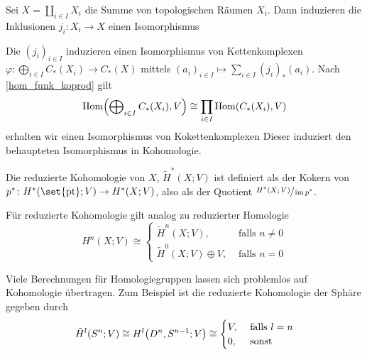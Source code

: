 \begin{satz}[{name=[Kohomologie und Summe von topologischen Räumen]}]
	Sei $X= \coprod_{i \in I} X_i$ die Summe von topologischen Räumen $X_i$. Dann induzieren die Inklusionen $j_i \colon X_i \to X$ einen Isomorphismus 
\end{satz}
\begin{beweis}
	Die $(j_i)_{i \in I}$ induzieren einen Isomorphismus von Kettenkomplexen $\varphi \colon \bigoplus_{i \in I}C_*(X_i) \to C_*(X)$ mittels $(a_i)_{i \in I} \mapsto \sum_{i \in I} (j_i)_* (a_i)$.
	Nach \autoref{hom_funk_koprod} gilt 
	\[
		\Hom \enbrace*{\bigoplus\nolimits_{i \in I} C_*(X_i),V} \cong \prod_{i \in I} \Hom \enbrace*{C_*(X_i),V}
	\]
	erhalten wir einen Isomorphismus von Kokettenkomplexen
	Dieser induziert den behaupteten Isomorphismus in Kohomologie.  
\end{beweis}

\begin{definition}[{name=[reduzierte Kohomologie]}]
	Die reduzierte Kohomologie von $X$, $\tilde{H}^*(X;V)$ ist definiert als der Kokern von $p^* \colon H^* \enbrace*{\set{\pt};V} \to H^*(X;V)$, also als der Quotient $\sfrac{H^*(X;V)}{\operatorname{im} p^*}$.
\end{definition}

\begin{bemerkung}[{name=[Zusammenhang zwischen reduzierter und regulärer Homologie]}]
	Für reduzierte Kohomologie gilt analog zu reduzierter Homologie
	\[
		H^n(X;V) \cong \begin{cases}
			\tilde{H}^n(X;V), &\text{ falls } n \not= 0\\
			\tilde{H}^0(X;V) \oplus V , &\text{ falls } n=0 
		\end{cases}
	\]
\end{bemerkung}

\begin{beispiel}[{name=[Kohomologie der Sphäre]}]
	Viele Berechnungen für Homologiegruppen lassen sich problemlos auf Kohomologie übertragen. Zum Beispiel ist die reduzierte Kohomologie der Sphäre gegeben durch
	\[
		\tilde{H}^l (S^n;V) \cong H^l \enbrace*{D^n,S^{n-1};V} \cong \begin{cases}
			V, &\text{ falls } l=n\\
			0, &\text{ sonst}  
		\end{cases}
	\]
\end{beispiel}
\newpage

